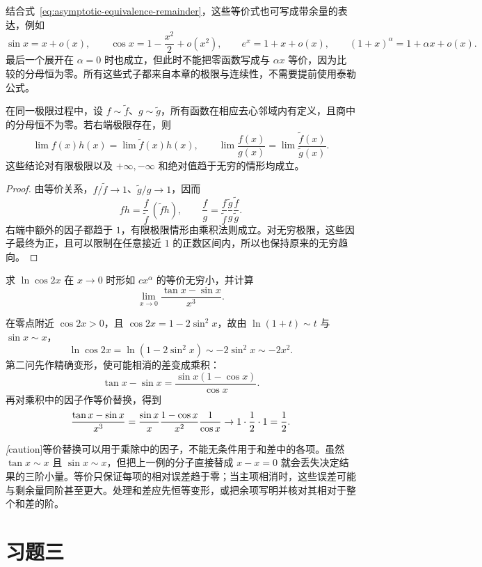 结合式~\eqref{eq:asymptotic-equivalence-remainder}，这些等价式也可写成带余量的表达，例如
\[
    \sin x=x+o(x),\qquad
    \cos x=1-\frac{x^2}{2}+o(x^2),\qquad
    e^x=1+x+o(x),\qquad
    (1+x)^\alpha=1+\alpha x+o(x).
\]
最后一个展开在 $\alpha=0$ 时也成立，但此时不能把零函数写成与 $\alpha x$ 等价，因为比较的分母恒为零。所有这些式子都来自本章的极限与连续性，不需要提前使用泰勒公式。

\begin{theorem}[等价因子的替换]
\label{thm:replacement-of-equivalent-factors}
在同一极限过程中，设 $f\sim\widetilde f$、$g\sim\widetilde g$，所有函数在相应去心邻域内有定义，且商中的分母恒不为零。若右端极限存在，则
\begin{equation}
    \lim f(x)h(x)=\lim\widetilde f(x)h(x),
    \qquad
    \lim\frac{f(x)}{g(x)}=\lim\frac{\widetilde f(x)}{\widetilde g(x)}.
    \label{eq:replacement-of-equivalent-factors}
\end{equation}
这些结论对有限极限以及 $+\infty,-\infty$ 和绝对值趋于无穷的情形均成立。
\end{theorem}

\begin{proof}
由等价关系，$f/\widetilde f\to1$、$\widetilde g/g\to1$，因而
\[
    fh=\frac f{\widetilde f}\,(\widetilde f h),
    \qquad
    \frac fg=\frac f{\widetilde f}\frac{\widetilde g}g
        \frac{\widetilde f}{\widetilde g}.
\]
右端中额外的因子都趋于 $1$，有限极限情形由乘积法则成立。对无穷极限，这些因子最终为正，且可以限制在任意接近 $1$ 的正数区间内，所以也保持原来的无穷趋向。
\end{proof}

\begin{example}
\label{ex:equivalent-infinitesimal-calculations}
求 $\ln\cos2x$ 在 $x\to0$ 时形如 $cx^\alpha$ 的等价无穷小，并计算
\[
    \lim_{x\to0}\frac{\tan x-\sin x}{x^3}.
\]
\end{example}

\begin{solve}
在零点附近 $\cos2x>0$，且 $\cos2x=1-2\sin^2x$，故由 $\ln(1+t)\sim t$ 与 $\sin x\sim x$，
\[
    \ln\cos2x=\ln(1-2\sin^2x)\sim-2\sin^2x\sim-2x^2.
\]
第二问先作精确变形，使可能相消的差变成乘积：
\[
    \tan x-\sin x=\frac{\sin x(1-\cos x)}{\cos x}.
\]
再对乘积中的因子作等价替换，得到
\[
    \frac{\tan x-\sin x}{x^3}
    =\frac{\sin x}{x}\frac{1-\cos x}{x^2}\frac1{\cos x}
    \to1\cdot\frac12\cdot1=\frac12.
    \qedhere
\]
\end{solve}

\emph[caution]{等价替换可以用于乘除中的因子，不能无条件用于和差中的各项。}虽然 $\tan x\sim x$ 且 $\sin x\sim x$，但把上一例的分子直接替成 $x-x=0$ 就会丢失决定结果的三阶小量。等价只保证每项的相对误差趋于零；当主项相消时，这些误差可能与剩余量同阶甚至更大。处理和差应先恒等变形，或把余项写明并核对其相对于整个和差的阶。

\section*{习题三}
